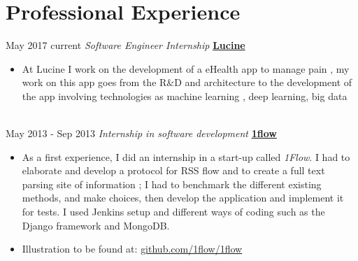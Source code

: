 \documentclass[letterpaper]{twentysecondcv} %
\begin{document}



\section{Professional Experience}

\begin{twenty} %

  \twentyitem
  {May 2017}
    {current}
        {\textit{Software Engineer Internship}}
        {\href{http://www.projet-lucine.com/}{\textbf{Lucine}}}
        {}
        {
          {\begin{itemize}
            \item At Lucine I work on the development of a eHealth app to manage
              pain , my work on this app goes from the R\&D and architecture to the development
              of the app involving technologies as machine learning , deep
              learning, big data
          \end{itemize}}
        }
    \\


  \twentyitem
      {May 2013 -}
    {Sep 2013}
        {\textit{Internship in software development}}
        {\href{https://github.com/1flow/1flow}{\textbf{1flow}}}
        {}
        {
          {\begin{itemize}

        \item As a first experience, I did an internship in a start-up called \textit{1Flow}. I had to elaborate and develop a protocol for RSS flow and to create a full text parsing site of information ; I had to benchmark the different existing methods, and make choices, then develop the application and implement it for tests. I used Jenkins setup and different ways of coding such as the Django framework and MongoDB.\\
        \item Illustration to be found at: \href{https://github.com/1flow/1flow}{github.com/1flow/1flow}
          \end{itemize}}
        }
    \\

\end{twenty}
\end{document}
